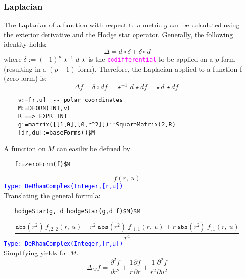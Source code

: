 \documentclass[12pt,a4paper]{article}
\newcommand{\spadfun}[1]{\textcolor{magenta}{\tt #1}}
\newcommand{\type}[1]{\textcolor{blue}{\tt\tiny #1}}
\begin{document}
\subsubsection{Laplacian}
The Laplacian of a function with respect to a metric $g$ can be calculated 
using the exterior derivative and the Hodge star operator. Generally, the
following identity holds:
\begin{displaymath}
  \Delta = d \circ \delta + \delta \circ d
\end{displaymath}
where $\delta:=(-1)^p\, \star^{-1}\,d \,\star$ is the \spadfun{codifferential}
to be applied on a $p$-form (resulting in a $(p-1)$-form). Therefore, the 
Laplacian applied to a function f (zero form) is:
\begin{displaymath}
   \Delta f = \delta \circ df = \star^{-1}\, d \,\star df=
     \star\, d \, \star df.
\end{displaymath}
\begin{lstlisting}
    v:=[r,u]  -- polar coordinates 
    M:=DFORM(INT,v)
    R ==> EXPR INT
    g:=matrix([[1,0],[0,r^2]])::SquareMatrix(2,R)
    [dr,du]:=baseForms()$M
\end{lstlisting}
A function on $M$ can easiliy be defined by
\begin{lstlisting}
   f:=zeroForm(f)$M
\end{lstlisting}
\begin{displaymath}
 f\left({r, \: u}\right)
\end{displaymath}
\type{Type: DeRhamComplex(Integer,[r,u])}
\\
Translating the general formula:
\begin{lstlisting}
   hodgeStar(g, d hodgeStar(g,d f)$M)$M
\end{lstlisting}
\begin{displaymath}
    \frac{{{\mathtt{abs}
    \left(
    {{{r} ^ {2}}}
    \right)}
    \  {{f _ {{{,2}{,2}}}}
    \left(
    {r, \: u}
    \right)}}+{{{r}
    ^ {2}} \  {\mathtt{abs}
    \left(
    {{{r} ^ {2}}}
    \right)}
    \  {{f _ {{{,1}{,1}}}}
    \left(
    {r, \: u}
    \right)}}+{r
    \  {\mathtt{abs}
    \left(
    {{{r} ^ {2}}}
    \right)}
    \  {{f _ {{,1}}}
    \left(
    {r, \: u}
    \right)}}}
    {{r} ^ {4}}
\end{displaymath}
\type{Type: DeRhamComplex(Integer,[r,u])}
\\
Simplifying yields for $M$:
\begin{displaymath}
 \Delta_M f = \frac{\partial^2 f}{\partial r^2} +
              \frac{1}{r} \frac{\partial f}{\partial r} +
              \frac{1}{r^2} \frac{\partial^2 f}{\partial u^2}
\end{displaymath}
%
\end{document}
